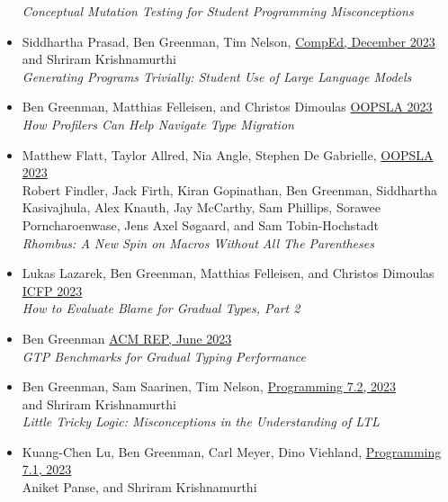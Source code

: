 \documentclass[11pt]{article}
\begin{document}
\begin{itemize}
  \emph{Conceptual Mutation Testing for Student Programming Misconceptions} \hfill {}
\item
  Siddhartha Prasad, Ben Greenman, Tim Nelson, \hfill \href{https://comped.acm.org/call-for-participation-2/}{CompEd, December 2023} \\
      and Shriram Krishnamurthi \\
    \emph{Generating Programs Trivially: Student Use of Large Language Models} \hfill {}
\item
  Ben Greenman, Matthias Felleisen, and Christos Dimoulas \hfill \href{https://2023.splashcon.org/track/splash-2023-oopsla}{OOPSLA 2023} \\
  \emph{How Profilers Can Help Navigate Type Migration} \hfill {}
\item
  Matthew Flatt, Taylor Allred, Nia Angle, Stephen De Gabrielle, \hfill \href{https://2023.splashcon.org/track/splash-2023-oopsla}{OOPSLA 2023} \\
  Robert Findler, Jack Firth, Kiran Gopinathan, Ben Greenman, Siddhartha Kasivajhula,
  Alex Knauth, Jay McCarthy, Sam Phillips, Sorawee Porncharoenwase, Jens Axel Søgaard, and Sam Tobin-Hochstadt \\
  \emph{Rhombus: A New Spin on Macros Without All The Parentheses} \hfill {}
\item
  Lukas Lazarek, Ben Greenman, Matthias Felleisen, and Christos Dimoulas \hfill \href{https://icfp23.sigplan.org/}{ICFP 2023} \\
  \emph{How to Evaluate Blame for Gradual Types, Part 2} \hfill {}
\item
  Ben Greenman \hfill \href{https://acm-rep.github.io/2023/}{ACM REP, June 2023} \\
    \emph{GTP Benchmarks for Gradual Typing Performance} \hfill {}
\item
  Ben Greenman, Sam Saarinen, Tim Nelson, \hfill \href{https://2023.programming-conference.org/}{Programming 7.2, 2023} \\
   and Shriram Krishnamurthi  \\ 
    \emph{Little Tricky Logic: Misconceptions in the Understanding of LT\/L} \hfill {}
\item
  Kuang-Chen Lu, Ben Greenman, Carl Meyer, Dino Viehland, \hfill \href{https://2023.programming-conference.org/}{Programming 7.1, 2023} \\
  Aniket Panse, and Shriram Krishnamurthi \\

\end{itemize}
\end{document}
